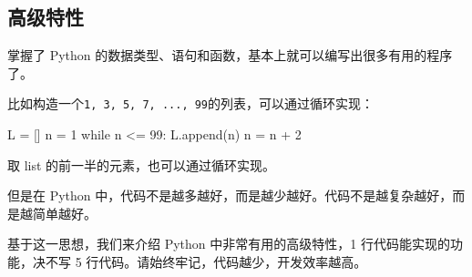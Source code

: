 \hypertarget{ux9ad8ux7ea7ux7279ux6027}{%
\subsection{高级特性}\label{ux9ad8ux7ea7ux7279ux6027}}

掌握了 Python
的数据类型、语句和函数，基本上就可以编写出很多有用的程序了。

比如构造一个\texttt{1,\ 3,\ 5,\ 7,\ ...,\ 99}的列表，可以通过循环实现：

\begin{pythoncode}
L = []
n = 1
while n <= 99:
    L.append(n)
    n = n + 2
\end{pythoncode}

取 list 的前一半的元素，也可以通过循环实现。

但是在 Python
中，代码不是越多越好，而是越少越好。代码不是越复杂越好，而是越简单越好。

基于这一思想，我们来介绍 Python 中非常有用的高级特性，1
行代码能实现的功能，决不写 5
行代码。请始终牢记，代码越少，开发效率越高。

